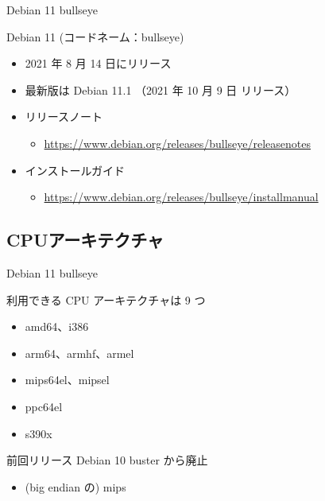\begin{frame}{Debian 11 bullseye}%

Debian 11 (コードネーム：bullseye)

\begin{itemize}
\item 2021 年 8 月 14 日にリリース
\item 最新版は Debian 11.1 （2021 年 10 月 9 日 リリース）
\item リリースノート
  \begin{itemize}
    \item \url{https://www.debian.org/releases/bullseye/releasenotes}
  \end{itemize}
\item インストールガイド
  \begin{itemize}
    \item \url{https://www.debian.org/releases/bullseye/installmanual}
  \end{itemize}  
\end{itemize}


\end{frame}


\subsection{CPUアーキテクチャ}

\begin{frame}{Debian 11 bullseye}%

利用できる CPU アーキテクチャは 9 つ

\begin{itemize}
\item amd64、i386
\item arm64、armhf、armel
\item mips64el、mipsel
\item ppc64el
\item s390x
\end{itemize}

前回リリース Debian 10 buster から廃止
\begin{itemize}
\item (big endian の) mips
\end{itemize}

\end{frame}


